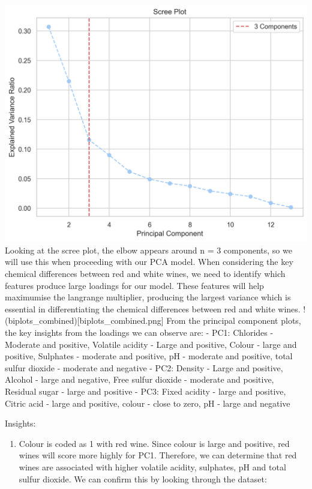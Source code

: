 \documentclass[
]{article}
\providecommand{\tightlist}{%
  \setlength{\itemsep}{0pt}\setlength{\parskip}{0pt}}
\begin{document}
\includegraphics{Scree_plot.png} Looking at the scree plot, the elbow
appears around n = 3 components, so we will use this when proceeding
with our PCA model. When considering the key chemical differences
between red and white wines, we need to identify which features produce
large loadings for our model. These features will help maximumise the
langrange multiplier, producing the largest variance which is essential
in differentiating the chemical differences between red and white wines.
!(biplots\_combined){[}biplots\_combined.png{]} From the principal
component plots, the key insights from the loadings we can observe are:
- PC1: Chlorides - Moderate and positive, Volatile acidity - Large and
positive, Colour - large and positive, Sulphates - moderate and
positive, pH - moderate and positive, total sulfur dioxide - moderate
and negative - PC2: Density - Large and positive, Alcohol - large and
negative, Free sulfur dioxide - moderate and positive, Residual sugar -
large and positive - PC3: Fixed acidity - large and positive, Citric
acid - large and positive, colour - close to zero, pH - large and
negative

Insights:

\begin{enumerate}
\def\labelenumi{\arabic{enumi}.}
\tightlist
\item
  Colour is coded as 1 with red wine. Since colour is large and
  positive, red wines will score more highly for PC1. Therefore, we can
  determine that red wines are associated with higher volatile acidity,
  sulphates, pH and total sulfur dioxide. We can confirm this by looking
  through the dataset:
\end{enumerate}
\end{document}
